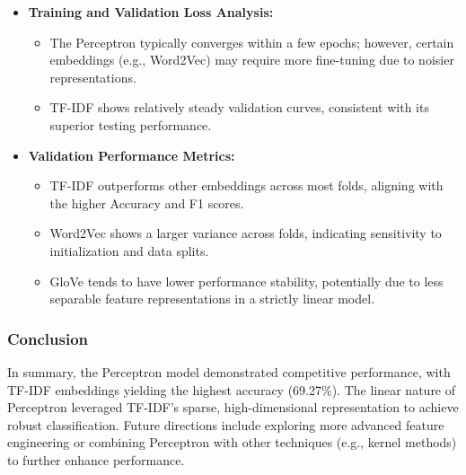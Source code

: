 \begin{itemize}
    \item \textbf{Training and Validation Loss Analysis:}
    \begin{itemize}
        \item The Perceptron typically converges within a few epochs; however, certain embeddings (e.g., Word2Vec) may require more fine-tuning due to noisier representations.
        \item TF-IDF shows relatively steady validation curves, consistent with its superior testing performance.
    \end{itemize}
    
    \item \textbf{Validation Performance Metrics:}
    \begin{itemize}
        \item TF-IDF outperforms other embeddings across most folds, aligning with the higher Accuracy and F1 scores.
        \item Word2Vec shows a larger variance across folds, indicating sensitivity to initialization and data splits.
        \item GloVe tends to have lower performance stability, potentially due to less separable feature representations in a strictly linear model.
    \end{itemize}
\end{itemize}

\subsubsection{Conclusion}
In summary, the Perceptron model demonstrated competitive performance, with TF-IDF embeddings yielding the highest accuracy (69.27\%). The linear nature of Perceptron leveraged TF-IDF’s sparse, high-dimensional representation to achieve robust classification. Future directions include exploring more advanced feature engineering or combining Perceptron with other techniques (e.g., kernel methods) to further enhance performance.
